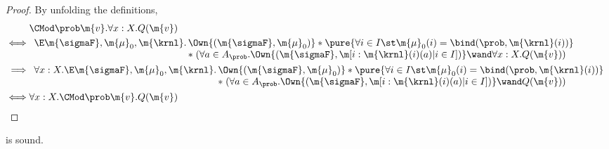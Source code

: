 \begin{proof}
  By unfolding the definitions,
\begin{align*}
      &\CMod\prob \m{v}. \forall x: X. Q(\m{v}) \\
    \iff &
    \begin{array}[t]{r@{\,}l}
    \E \m{\sigmaF}, \m{\mu}_0, \m{\krnl}.
      &\Own{(\m{\sigmaF}, \m{\mu}_0)} *
      \pure{
        \forall i\in I\st
          \m{\mu}_0(i) = \bind(\prob, \m{\krnl}(i))
      }\\ & * \; (
        \forall a \in A_{\prob}.
\Own{(\m{\sigmaF}, \m[i: \m{\krnl}(i)(a) | i \in I])} \wand \forall x: X. Q(\m{v})
          )
    \end{array}
    \\
    \implies &
    \begin{array}[t]{r@{\,}l}
    \forall x: X.
    \E \m{\sigmaF}, \m{\mu}_0, \m{\krnl}.
      &\Own{(\m{\sigmaF}, \m{\mu}_0)} *
      \pure{
        \forall i\in I\st
          \m{\mu}_0(i) = \bind(\prob, \m{\krnl}(i))
      }\\ & * \; (
        \forall a \in A_{\prob}.
\Own{(\m{\sigmaF}, \m[i: \m{\krnl}(i)(a) | i \in I])} \wand Q(\m{v})
          )
    \end{array}\\
    \iff & \forall x: X. \CMod\prob \m{v}. Q(\m{v})
  \end{align*}
\end{proof} \begin{lemma}
\label{proof:c-pure}
   is sound.
\end{lemma}

